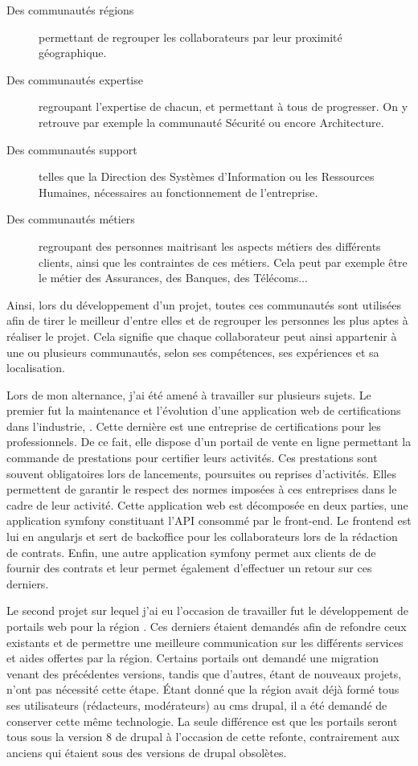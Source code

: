\begin{description}
	\item [Des communautés régions] permettant de regrouper les collaborateurs par leur proximité géographique.
	\item [Des communautés expertise] regroupant l'expertise de chacun, et permettant à tous de progresser. On y retrouve par exemple la communauté Sécurité ou encore Architecture.
	\item [Des communautés support] telles que la Direction des Systèmes d'Information ou les Ressources Humaines, nécessaires au fonctionnement de l'entreprise.
	\item [Des communautés métiers] regroupant des personnes maitrisant les aspects métiers des différents clients, ainsi que les contraintes de ces métiers. Cela peut par exemple être le métier des Assurances, des Banques, des Télécoms... 
\end{description}

Ainsi, lors du développement d'un projet, toutes ces communautés sont utilisées afin de tirer le meilleur d'entre elles et de regrouper les personnes les plus aptes à réaliser le projet. Cela signifie que chaque collaborateur peut ainsi appartenir à une ou plusieurs communautés, selon ses compétences, ses expériences et sa localisation. 

Lors de mon alternance, j'ai été amené à travailler sur plusieurs sujets. Le premier fut la maintenance et l'évolution d'une application web de certifications dans l'industrie, \bv. Cette dernière est une entreprise de certifications pour les professionnels. De ce fait, elle dispose d’un portail de vente en ligne permettant la commande de prestations pour certifier leurs activités. Ces prestations sont souvent obligatoires lors de lancements, poursuites ou reprises d'activités. Elles permettent de garantir le respect des normes imposées à ces entreprises dans le cadre de leur activité. Cette application web est décomposée en deux parties, une application \gls{symfony} constituant l'\gls{API} consommé par le front-end. Le \gls{frontend} est lui en \gls{angularjs} et sert de \gls{backoffice} pour les collaborateurs \bv{} lors de la rédaction de contrats. Enfin, une autre application \gls{symfony} permet aux clients de \bv{} de fournir des contrats et leur permet également d'effectuer un retour sur ces derniers.

Le second projet sur lequel j'ai eu l'occasion de travailler fut le développement de portails web pour la région \naq{}. Ces derniers étaient demandés afin de refondre ceux existants et de permettre une meilleure communication sur les différents services et aides offertes par la région. Certains portails ont demandé une migration venant des précédentes versions, tandis que d'autres, étant de nouveaux projets, n'ont pas nécessité cette étape. Étant donné que la région avait déjà formé tous ses utilisateurs (rédacteurs, modérateurs) au \gls{cms} \gls{drupal}, il a été demandé de conserver cette même technologie. La seule différence est que les portails seront tous sous la version 8 de \gls{drupal} à l'occasion de cette refonte, contrairement aux anciens qui étaient sous des versions de \gls{drupal} obsolètes. 

